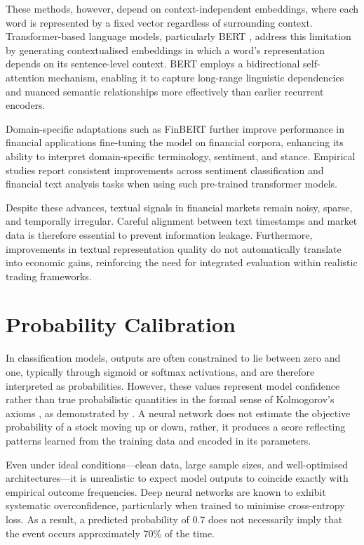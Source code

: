 \documentclass{l4proj}
\begin{document}
These methods, however, depend on context-independent embeddings, where each word is represented by a fixed vector regardless of surrounding context. Transformer-based language models, particularly BERT \cite{devlin2019bertpretrainingdeepbidirectional}, address this limitation by generating contextualised embeddings in which a word’s representation depends on its sentence-level context. BERT employs a bidirectional self-attention mechanism, enabling it to capture long-range linguistic dependencies and nuanced semantic relationships more effectively than earlier recurrent encoders. 

Domain-specific adaptations such as FinBERT \cite{araci2019finbertfinancialsentimentanalysis} further improve performance in financial applications fine-tuning the model on financial corpora, enhancing its ability to interpret domain-specific terminology, sentiment, and stance. Empirical studies report consistent improvements across sentiment classification and financial text analysis tasks when using such pre-trained transformer models. 

Despite these advances, textual signals in financial markets remain noisy, sparse, and temporally irregular. Careful alignment between text timestamps and market data is therefore essential to prevent information leakage. Furthermore, improvements in textual representation quality do not automatically translate into economic gains, reinforcing the need for integrated evaluation within realistic trading frameworks.

\section{Probability Calibration}

In classification models, outputs are often constrained to lie between zero and one, typically through sigmoid or softmax activations, and are therefore interpreted as probabilities. However, these values represent model confidence rather than true probabilistic quantities in the formal sense of Kolmogorov’s axioms \citep{PLATO2005960}, as demonstrated by \cite{guo2017calibrationmodernneuralnetworks}. A neural network does not estimate the objective probability of a stock moving up or down, rather, it produces a score reflecting patterns learned from the training data and encoded in its parameters.

Even under ideal conditions—clean data, large sample sizes, and well-optimised architectures—it is unrealistic to expect model outputs to coincide exactly with empirical outcome frequencies. Deep neural networks are known to exhibit systematic overconfidence, particularly when trained to minimise cross-entropy loss. As a result, a predicted probability of 0.7 does not necessarily imply that the event occurs approximately 70\% of the time.
\end{document}
